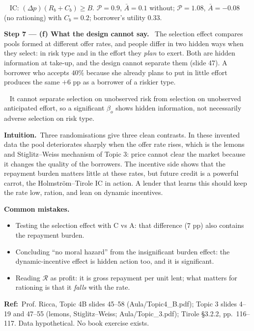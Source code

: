 \documentclass[11pt,a4paper]{article}
\newcommand{\step}[2]{\par\medskip\noindent\textbf{Step #1 --- #2.}~}
\newcommand{\intuition}{\par\medskip\noindent\textbf{Intuition.}~}
\newcommand{\refbib}{\par\smallskip\noindent\textbf{Ref:}~}
\newcommand{\answer}[1]{\par\smallskip\noindent\fbox{\textbf{Answer #1.}}~}
\newcommand{\pitfalls}{\par\medskip\noindent\textbf{Common mistakes.}}
\begin{document}
\answer{(e)} IC: $(\Delta p)(R_b+C_b)\ge B$. $\mathcal P=0.9$, $\bar A=0.1$ without; $\mathcal P=1.08$, $\bar A=-0.08$
(no rationing) with $C_b=0.2$; borrower's utility $0.33$.

\step{7}{(f) What the design cannot say} The selection effect compares pools formed at different offer rates, and
people differ in two hidden ways when they select: in risk type and in the effort they \emph{plan} to exert. Both
are hidden information at take-up, and the design cannot separate them (slide 47). A borrower who accepts
$40\%$ because she already plans to put in little effort produces the same $+6$ pp as a borrower of a riskier type.

\answer{(f)} It cannot separate selection on unobserved risk from selection on unobserved anticipated effort, so a
significant $\beta_o$ shows hidden information, not necessarily adverse selection on risk type.

\intuition Three randomisations give three clean contrasts. In these invented data the pool deteriorates sharply
when the offer rate rises, which is the lemons and Stiglitz--Weiss mechanism of Topic 3: price cannot clear the
market because it changes the quality of the borrowers. The incentive side shows that the repayment burden matters
little at these rates, but future credit is a powerful carrot, the Holmström--Tirole IC in action. A lender that
learns this should keep the rate low, ration, and lean on dynamic incentives.

\pitfalls
\begin{itemize}
  \item Testing the selection effect with C vs A: that difference ($7$ pp) also contains the repayment burden.
  \item Concluding ``no moral hazard'' from the insignificant burden effect: the dynamic-incentive effect is hidden action too, and it is significant.
  \item Reading $\mathcal R$ as profit: it is gross repayment per unit lent; what matters for rationing is that it \emph{falls} with the rate.
\end{itemize}

\refbib Prof. Ricca, Topic 4B slides 45--58 (Aula/Topic4\_B.pdf); Topic 3 slides 4--19 and 47--55 (lemons,
Stiglitz--Weiss; Aula/Topic\_3.pdf); Tirole \S3.2.2, pp.~116--117. Data hypothetical. No book exercise exists.
\end{document}
